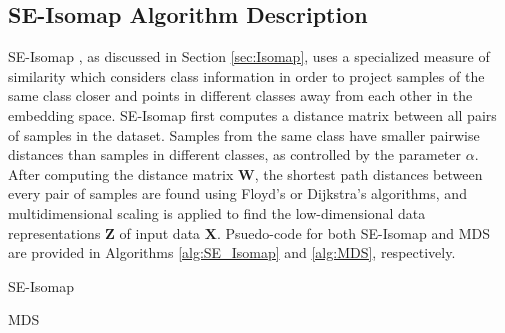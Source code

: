 \subsection{SE-Isomap Algorithm Description}
SE-Isomap \citep{Ribeiro2008SupervisedIsomap}, as discussed in Section \ref{sec:Isomap}, uses a specialized measure of similarity which considers class information in order to project samples of the same class closer and points in different classes away from each other in the embedding space. SE-Isomap first computes a distance matrix between all pairs of samples in the dataset.  Samples from the same class have smaller pairwise distances than samples in different classes, as controlled by the parameter $\alpha$.  After computing the distance matrix $\bm{W}$, the shortest path distances between every pair of samples are found using Floyd's or Dijkstra's algorithms, and multidimensional  scaling is applied to find the low-dimensional data representations $\bm{Z}$ of input data $\bm{X}$. Psuedo-code for both SE-Isomap and MDS are provided in Algorithms \ref{alg:SE_Isomap} and \ref{alg:MDS}, respectively.

\begin{algorithm}[h!]
	\caption{SE-Isomap}
	\label{alg:SE_Isomap}
	\begin{algorithmic}[1]
		\Else
		\EndIf
		\EndFor
	\end{algorithmic}
\end{algorithm}

\begin{algorithm}[H]
	\caption{MDS}
	\label{alg:MDS}
	\begin{algorithmic}[1]
	\end{algorithmic}
\end{algorithm}

